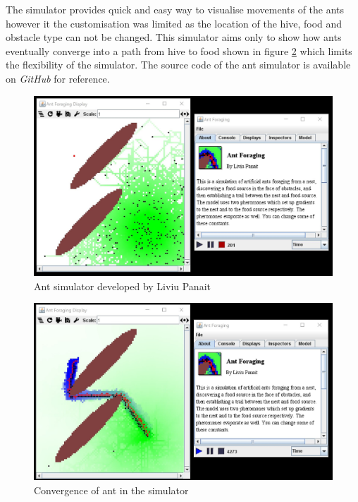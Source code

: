 \documentclass[a4paper, oneside, 11pt]{report}
\begin{document}
The simulator provides quick and easy way to visualise movements of the ants however it the customisation was limited as the location of the hive, food and obstacle type can not be changed. This simulator aims only to show how ants eventually converge into a path from hive to food shown in figure \ref{fig:MASON_Ant_Converged} which limits the flexibility of the simulator. The source code of the ant simulator is available on \textit{GitHub} for reference.

\begin{figure}[htb]
	\includegraphics[width=1.0 \columnwidth]{MASON_Ant.jpg}
	\caption{Ant simulator developed by Liviu Panait \citep{Ant_Simulator}}
	\label{fig:MASON_Ant}
\end{figure}

\begin{figure}[htb]
	\includegraphics[width=1.0 \columnwidth]{MASON_Ant_Converged.jpg}
	\caption{Convergence of ant in the simulator \citep{Ant_Simulator}}
	\label{fig:MASON_Ant_Converged}
\end{figure}
\end{document}
